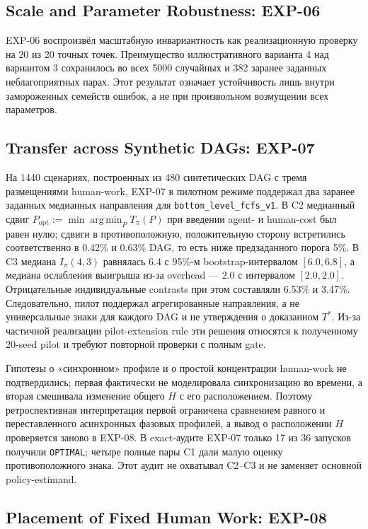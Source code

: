 \subsection{Scale and Parameter Robustness: EXP-06}

EXP-06 воспроизвёл масштабную инвариантность как реализационную проверку на 20
из 20 точных точек.
Преимущество иллюстративного варианта 4 над вариантом 3 сохранилось во всех 5000
случайных и 382 заранее заданных неблагоприятных парах. Этот результат означает
устойчивость лишь внутри замороженных семейств ошибок, а не при произвольном
возмущении всех параметров.

\subsection{Transfer across Synthetic DAGs: EXP-07}

На 1440 сценариях, построенных из 480 синтетических DAG с тремя размещениями
human-work, EXP-07 в пилотном режиме поддержал два заранее заданных медианных
направления для \texttt{bottom\_level\_fcfs\_v1}. В C2 медианный сдвиг
$P_{\mathrm{opt}}:=\min\operatorname*{arg\,min}_{P}T_\pi(P)$ при введении
agent- и human-cost был равен нулю; сдвиги в
противоположную, положительную сторону встретились соответственно в 0.42\% и
0.63\% DAG, то есть ниже предзаданного порога 5\%. В C3 медиана
$I_\pi(4,3)$ равнялась 6.4 с 95\%-м bootstrap-интервалом $[6.0,6.8]$, а
медиана ослабления выигрыша из-за overhead --- 2.0 с интервалом $[2.0,2.0]$.
Отрицательные индивидуальные contrasts при этом составляли 6.53\% и 3.47\%.
Следовательно, пилот поддержал агрегированные направления, а не
универсальные знаки для каждого DAG и не утверждения о доказанном $T^*$.
Из-за частичной реализации pilot-extension rule эти решения относятся к
полученному 20-seed pilot и требуют повторной проверки с полным gate.

Гипотезы о «синхронном» профиле и о простой концентрации human-work не
подтвердились; первая фактически не моделировала синхронизацию во времени, а
вторая смешивала изменение общего $H$ с его расположением. Поэтому
ретроспективная интерпретация первой ограничена сравнением равного и
переставленного асинхронных фазовых профилей, а вывод о расположении $H$
проверяется заново в EXP-08. В exact-аудите EXP-07 только 17 из 36 запусков
получили \texttt{OPTIMAL}; четыре полные пары C1 дали малую оценку
противоположного знака. Этот аудит не охватывал C2--C3 и не заменяет основной
policy-estimand.

\subsection{Placement of Fixed Human Work: EXP-08}

